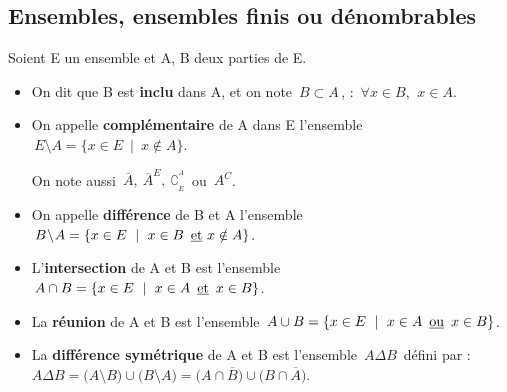 \vspace{1cm}



\subsection[Ensembles]{Ensembles, ensembles finis ou dénombrables}

\vspace{0.9cm}

Soient E un ensemble et A, B deux parties de E.
\begin{itemize}[leftmargin=1cm,label=•]
	\item On dit que B est \textbf{inclu} dans A, et on note $\,B\subset A\,$, \ssi : \(\,\forall x\in B,\ \, x\in A\).
	
	\item On appelle \textbf{complémentaire} de A dans E l'ensemble \(\,E\!\setminus\!A=\{x\in E \ \mid \ x\notin A\}\).\vspace{0.1cm}\\
	\begin{small} On note aussi \(\displaystyle\,\overline{A},\ \overline{A}^E,\ \complement_{_E}^{^A}\,\) ou \(\,A^C\).\end{small}
	
	\item On appelle \textbf{différence} de B et A l'ensemble \(\,B\!\setminus\!A = \{x\in E \ \mid \ x\in B \, \text{ \underline{et} } x\notin A\}\). 
	
	\item L'\textbf{intersection} de A et B est l'ensemble \(\,A\cap B=\{x\in E \ \mid \ x\in A\, \text{ \underline{et} }\, x\in B\}\).
	
	\item La \textbf{réunion} de A et B est l'ensemble \(\,A\cup B=\{x\in E \ \mid \ x\in A \, \text{ \underline{ou} } \, x\in B\}\).
	
	\item La \textbf{différence symétrique} de A et B est l'ensemble \(\,A\Delta B\,\) défini par :\vspace{0.1cm}\\
    \(A\Delta B=\bigl(A\!\setminus\! B\bigr)\cup \bigl(B\!\setminus\!A\bigr)=\bigl(A\cap \overline{B}\bigr)\cup\bigl(B\cap \overline{A}\bigr)\).

\end{itemize}

